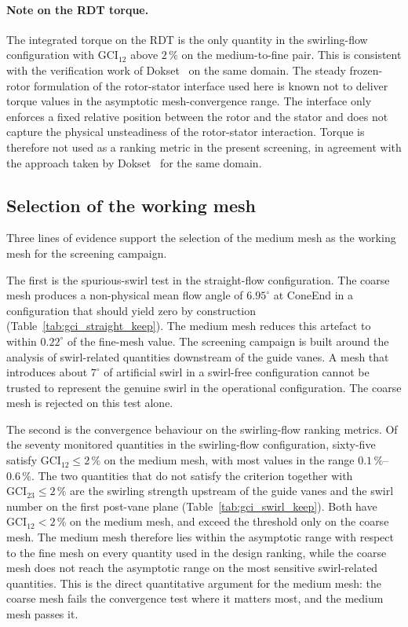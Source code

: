 \paragraph{Note on the RDT torque.}
The integrated torque on the RDT is the only quantity in the swirling-flow configuration with $\mathrm{GCI}_{12}$ above $2\,\%$ on the medium-to-fine pair. This is consistent with the verification work of Dokset~\cite{Dokset2025} on the same domain. The steady frozen-rotor formulation of the rotor-stator interface used here is known not to deliver torque values in the asymptotic mesh-convergence range. The interface only enforces a fixed relative position between the rotor and the stator and does not capture the physical unsteadiness of the rotor-stator interaction. Torque is therefore not used as a ranking metric in the present screening, in agreement with the approach taken by Dokset~\cite{Dokset2025} for the same domain.

\subsection{Selection of the working mesh}
\label{sec:gci_pick}

Three lines of evidence support the selection of the medium mesh as the working mesh for the screening campaign.

The first is the spurious-swirl test in the straight-flow configuration. The coarse mesh produces a non-physical mean flow angle of $6.95^\circ$ at ConeEnd in a configuration that should yield zero by construction (Table~\ref{tab:gci_straight_keep}). The medium mesh reduces this artefact to within $0.22^\circ$ of the fine-mesh value. The screening campaign is built around the analysis of swirl-related quantities downstream of the guide vanes. A mesh that introduces about $7^\circ$ of artificial swirl in a swirl-free configuration cannot be trusted to represent the genuine swirl in the operational configuration. The coarse mesh is rejected on this test alone.

The second is the convergence behaviour on the swirling-flow ranking metrics. Of the seventy monitored quantities in the swirling-flow configuration, sixty-five satisfy $\mathrm{GCI}_{12} \leq 2\,\%$ on the medium mesh, with most values in the range $0.1\,\%$--$0.6\,\%$. The two quantities that do not satisfy the criterion together with $\mathrm{GCI}_{23} \leq 2\,\%$ are the swirling strength upstream of the guide vanes and the swirl number on the first post-vane plane (Table~\ref{tab:gci_swirl_keep}). Both have $\mathrm{GCI}_{12} < 2\,\%$ on the medium mesh, and exceed the threshold only on the coarse mesh. The medium mesh therefore lies within the asymptotic range with respect to the fine mesh on every quantity used in the design ranking, while the coarse mesh does not reach the asymptotic range on the most sensitive swirl-related quantities. This is the direct quantitative argument for the medium mesh: the coarse mesh fails the convergence test where it matters most, and the medium mesh passes it.


